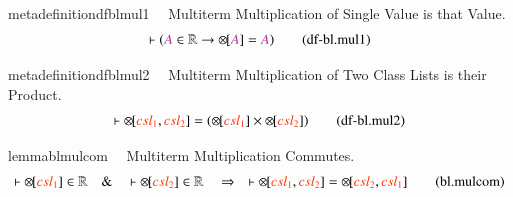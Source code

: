 \begin{restatable}{metadefinition}{dfblmul1}~~ Multiterm Multiplication of Single
Value is that Value.
\begin{align}
\vdash ( \mc{A} \in \mathbb{R} \rightarrow {\otimes\hspace{-1pt}[} \mc{A} ] =
    \mc{A} )\label{eq:df-bl.mul1}\tag{df-bl.mul1}
\end{align}
\end{restatable}

\begin{restatable}{metadefinition}{dfblmul2}~~ Multiterm Multiplication of Two Class
Lists is their Product.
\begin{align}
\vdash {\otimes\hspace{-1pt}[} \msc{csl_1} , \msc{csl_2} ] = (
    {\otimes\hspace{-1pt}[} \msc{csl_1} ] \times {\otimes\hspace{-1pt}[}
    \msc{csl_2} ] )\label{eq:df-bl.mul2}\tag{df-bl.mul2}
\end{align}
\end{restatable}

\begin{restatable}{lemma}{blmulcom}~~ Multiterm Multiplication Commutes.
\begin{align}
\vdash {\otimes\hspace{-1pt}[} \msc{csl_1} ] \in \mathbb{R}\quad\&\quad \vdash
    {\otimes\hspace{-1pt}[} \msc{csl_2} ] \in \mathbb{R}\quad\Rightarrow\quad
    \vdash {\otimes\hspace{-1pt}[} \msc{csl_1} , \msc{csl_2} ] =
    {\otimes\hspace{-1pt}[} \msc{csl_2} , \msc{csl_1}
    ]\label{eq:bl.mulcom}\tag{bl.mulcom}
\end{align}
\end{restatable}

